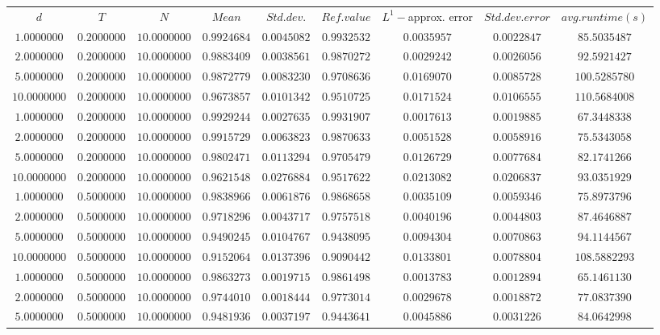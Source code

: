 \begin{tabular}{ccccccccc}
$d$ & $T$ & $N$ & $Mean$ & $Std. dev.$ & $Ref. value$ & $L^1-$approx. error & $Std. dev. error$ & $avg. runtime (s)$\\
$1.0000000$ & $0.2000000$ & $10.0000000$ & $0.9924684$ & $0.0045082$ & $0.9932532$ & $0.0035957$ & $0.0022847$ & $85.5035487$\\
$2.0000000$ & $0.2000000$ & $10.0000000$ & $0.9883409$ & $0.0038561$ & $0.9870272$ & $0.0029242$ & $0.0026056$ & $92.5921427$\\
$5.0000000$ & $0.2000000$ & $10.0000000$ & $0.9872779$ & $0.0083230$ & $0.9708636$ & $0.0169070$ & $0.0085728$ & $100.5285780$\\
$10.0000000$ & $0.2000000$ & $10.0000000$ & $0.9673857$ & $0.0101342$ & $0.9510725$ & $0.0171524$ & $0.0106555$ & $110.5684008$\\
$1.0000000$ & $0.2000000$ & $10.0000000$ & $0.9929244$ & $0.0027635$ & $0.9931907$ & $0.0017613$ & $0.0019885$ & $67.3448338$\\
$2.0000000$ & $0.2000000$ & $10.0000000$ & $0.9915729$ & $0.0063823$ & $0.9870633$ & $0.0051528$ & $0.0058916$ & $75.5343058$\\
$5.0000000$ & $0.2000000$ & $10.0000000$ & $0.9802471$ & $0.0113294$ & $0.9705479$ & $0.0126729$ & $0.0077684$ & $82.1741266$\\
$10.0000000$ & $0.2000000$ & $10.0000000$ & $0.9621548$ & $0.0276884$ & $0.9517622$ & $0.0213082$ & $0.0206837$ & $93.0351929$\\
$1.0000000$ & $0.5000000$ & $10.0000000$ & $0.9838966$ & $0.0061876$ & $0.9868658$ & $0.0035109$ & $0.0059346$ & $75.8973796$\\
$2.0000000$ & $0.5000000$ & $10.0000000$ & $0.9718296$ & $0.0043717$ & $0.9757518$ & $0.0040196$ & $0.0044803$ & $87.4646887$\\
$5.0000000$ & $0.5000000$ & $10.0000000$ & $0.9490245$ & $0.0104767$ & $0.9438095$ & $0.0094304$ & $0.0070863$ & $94.1144567$\\
$10.0000000$ & $0.5000000$ & $10.0000000$ & $0.9152064$ & $0.0137396$ & $0.9090442$ & $0.0133801$ & $0.0078804$ & $108.5882293$\\
$1.0000000$ & $0.5000000$ & $10.0000000$ & $0.9863273$ & $0.0019715$ & $0.9861498$ & $0.0013783$ & $0.0012894$ & $65.1461130$\\
$2.0000000$ & $0.5000000$ & $10.0000000$ & $0.9744010$ & $0.0018444$ & $0.9773014$ & $0.0029678$ & $0.0018872$ & $77.0837390$\\
$5.0000000$ & $0.5000000$ & $10.0000000$ & $0.9481936$ & $0.0037197$ & $0.9443641$ & $0.0045886$ & $0.0031226$ & $84.0642998$\\

\end{tabular}
